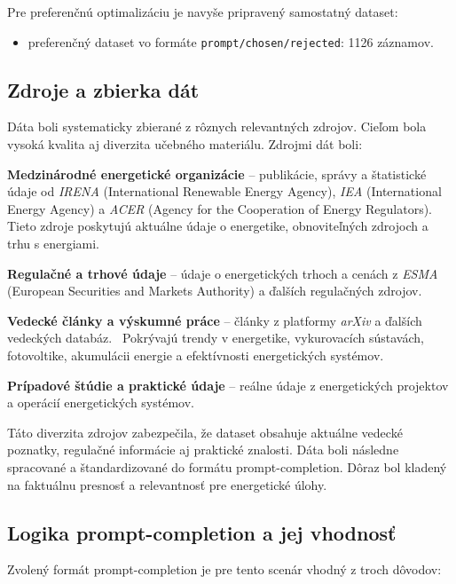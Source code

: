 Pre preferenčnú optimalizáciu je navyše pripravený samostatný dataset:
\begin{itemize}
    \item preferenčný dataset vo formáte \texttt{prompt/chosen/rejected}: 1126 záznamov.
\end{itemize}

\subsection{Zdroje a zbierka dát}

Dáta boli systematicky zbierané z rôznych relevantných zdrojov. Cieľom bola vysoká kvalita aj diverzita učebného materiálu. Zdrojmi dát boli:

\noindent\textbf{Medzinárodné energetické organizácie} -- publikácie, správy a štatistické údaje od \textit{IRENA} (International Renewable Energy Agency), \textit{IEA} (International Energy Agency) a \textit{ACER} (Agency for the Cooperation of Energy Regulators).~\cite{IRENA,IEA,ACER} Tieto zdroje poskytujú aktuálne údaje o energetike, obnoviteľných zdrojoch a trhu s energiami.\par\medskip
\noindent\textbf{Regulačné a trhové údaje} -- údaje o energetických trhoch a cenách z \textit{ESMA} (European Securities and Markets Authority) a ďalších regulačných zdrojov.~\cite{ESMA}\par\medskip
\noindent\textbf{Vedecké články a výskumné práce} -- články z platformy \textit{arXiv} a ďalších vedeckých databáz.~\cite{arXiv} Pokrývajú trendy v energetike, vykurovacích sústavách, fotovoltike, akumulácii energie a efektívnosti energetických systémov.\par\medskip
\noindent\textbf{Prípadové štúdie a praktické údaje} -- reálne údaje z energetických projektov a operácií energetických systémov.\par\medskip


Táto diverzita zdrojov zabezpečila, že dataset obsahuje aktuálne vedecké poznatky, regulačné informácie aj praktické znalosti. Dáta boli následne spracované a štandardizované do formátu prompt-completion. Dôraz bol kladený na faktuálnu presnosť a relevantnosť pre energetické úlohy.

\subsection{Logika prompt-completion a jej vhodnosť}

Zvolený formát prompt-completion je pre tento scenár vhodný z troch dôvodov:

